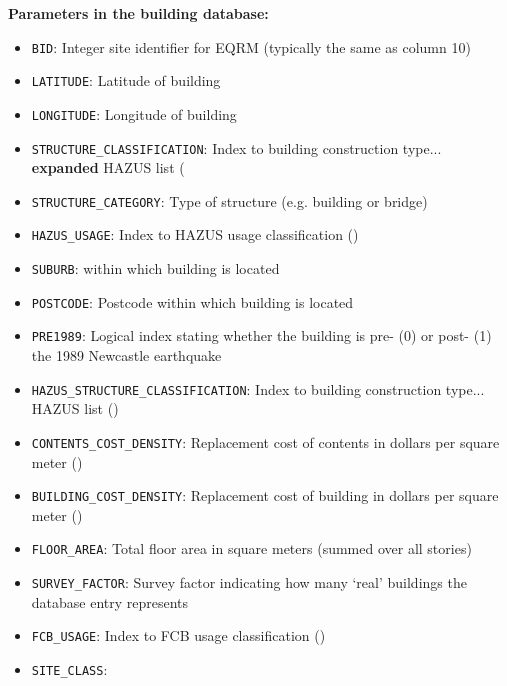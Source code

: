 \textbf{Parameters in the building database:}
\begin{itemize}
\item \texttt{BID}: Integer site identifier for EQRM (typically the same as column 10)\\
\item \texttt{LATITUDE}: Latitude of building \\
\item \texttt{LONGITUDE}: Longitude of building \\
\item \texttt{STRUCTURE_CLASSIFICATION}: Index to building construction type... \textbf{expanded} HAZUS list (
\item \texttt{STRUCTURE_CATEGORY}: Type of structure (e.g. building or bridge)\\
\item \texttt{HAZUS_USAGE}: Index to HAZUS usage classification () \\
\item \texttt{SUBURB}: within which building is located \\
\item \texttt{POSTCODE}: Postcode within which building is located \\
\item \texttt{PRE1989}: Logical index stating whether the building is pre- (0) or post- (1) the 1989 Newcastle earthquake\\
\item \texttt{HAZUS_STRUCTURE_CLASSIFICATION}: Index to building construction type... HAZUS list ()\\
\item \texttt{CONTENTS_COST_DENSITY}: Replacement cost of contents in dollars per square meter ()\\
\item \texttt{BUILDING_COST_DENSITY}: Replacement cost of building in dollars per square meter ()\\
\item \texttt{FLOOR_AREA}: Total floor area in square meters (summed over all stories)\\
\item \texttt{SURVEY_FACTOR}: Survey factor indicating how many `real' buildings the database entry represents\\
\item \texttt{FCB_USAGE}: Index to FCB usage classification ()\\
\item \texttt{SITE_CLASS}:
\end{itemize}


